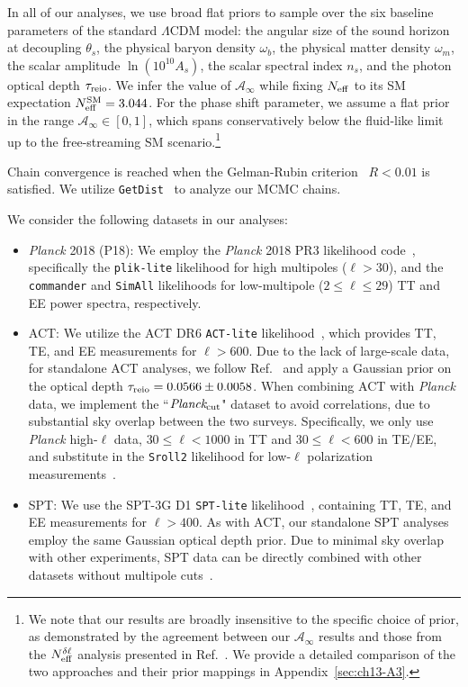 In all of our analyses, we use broad flat priors to sample over the six baseline parameters of the standard $\Lambda$CDM model: the angular size of the sound horizon at decoupling $\theta_s$, the physical baryon density $\omega_b$, the physical matter density $\omega_m$, the scalar amplitude $\ln(10^{10}A_s)$, the scalar spectral index $n_s$, and the photon optical depth $\tau_{\rm reio}$.
We infer the value of $\mathcal{A}_\infty$ while fixing $N_\mathrm{eff}$ to its SM expectation $N_\mathrm{eff}^{\rm SM} = 3.044$. For the phase shift parameter, we assume a flat prior in the range $\mathcal{A}_\infty \in[0, 1]$, which spans conservatively below the fluid-like limit up to the free-streaming SM scenario.\footnote{We note that our results are broadly insensitive to the specific choice of prior, as demonstrated by the agreement between our $\mathcal{A}_\infty$ results and those from the $N_\mathrm{eff}^{\delta\ell}$ analysis presented in Ref.~\cite{Montefalcone:2025unv}. We provide a detailed comparison of the two approaches and their prior mappings in Appendix~\ref{sec:ch13-A3}.}

Chain convergence is reached when the Gelman-Rubin criterion~\cite{Gelman:1992zz} $R < 0.01$ is satisfied. We utilize \texttt{GetDist}~\cite{2019arXiv191013970L} to analyze our MCMC chains.
\smallskip

We consider the following datasets in our analyses:
\begin{itemize}
    \item \textit{Planck} 2018 (P18): We employ the \textit{Planck} 2018 PR3 likelihood code~\cite{Planck:2019nip}, specifically the \texttt{plik-lite} likelihood for high multipoles ($\ell>30$), and the \texttt{commander} and \texttt{SimAll} likelihoods for low-multipole ($2\leq \ell \leq 29$) TT and EE power spectra, respectively.
    \item ACT: We utilize the ACT DR6 \texttt{ACT-lite} likelihood~\cite{ACT:2025fju}, which provides TT, TE, and EE measurements for $\ell>600$. Due to the lack of large-scale data, for standalone ACT analyses, we follow Ref.~\cite{ACT:2025fju} and apply a Gaussian prior on the optical depth $\tau_{\rm reio}= 0.0566\pm 0.0058$. When combining ACT with \textit{Planck} data, we implement the ``$\it{Planck_{\rm cut}}$" dataset to avoid correlations, due to substantial sky overlap between the two surveys. Specifically, we only use \textit{Planck} high-$\ell$ data, $30\leq \ell < 1000$ in TT and $30\leq \ell < 600$ in TE/EE, and substitute in the \texttt{Sroll2} likelihood for low-$\ell$ polarization measurements~\cite{ACT:2025fju}.
    \item SPT: We use the SPT-3G D1 \texttt{SPT-lite} likelihood~\cite{SPT-3G:2025bzu}, containing TT, TE, and EE measurements for $\ell>400$. As with ACT, our standalone SPT analyses employ the same Gaussian optical depth prior. Due to minimal sky overlap with other experiments, SPT data can be directly combined with other datasets without multipole cuts~\cite{SPT-3G:2025zuh}.
\end{itemize}

